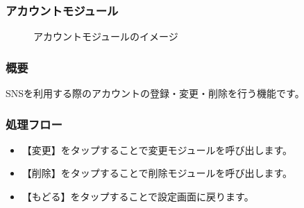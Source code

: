 \documentclass[a4j]{jarticle}
\begin{document}
\subsubsection{アカウントモジュール\label{アカウント}} %
\begin{figure}[H]
    \begin{center}
    \caption {アカウントモジュールのイメージ}
    \label{functionselection}
    \end{center}
\end{figure}
\subsubsection*{概要}
SNSを利用する際のアカウントの登録・変更・削除を行う機能です。
\subsubsection*{処理フロー}
\begin{itemize}
\item 【変更】をタップすることで変更モジュールを呼び出します。
\item 【削除】をタップすることで削除モジュールを呼び出します。
\item 【もどる】をタップすることで設定画面に戻ります。
\end{itemize}
\end{document}
